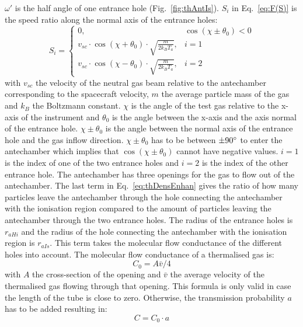 	$\omega'$ is the half angle of one entrance hole (Fig.~\ref{fig:thAntIs}). $S_i$ in Eq.~\eqref{eq:F(S)} is the speed ratio along the normal axis of the entrance holes:
	\begin{equation}
		S_i = 
		\begin{cases}
			0, & \cos(\chi \pm \theta_0) < 0\\
			v_{sc}\cdot \cos(\chi + \theta_0)\cdot \sqrt{\frac{m}{2k_B T_a}}, & i=1\\
			v_{sc}\cdot \cos(\chi - \theta_0)\cdot \sqrt{\frac{m}{2k_B T_a}}, & i=2
		\end{cases}
	\end{equation}
	with $v_{sc}$ the velocity of the neutral gas beam relative to the antechamber corresponding to the spacecraft velocity, $m$ the average particle mass of the gas and $k_B$ the Boltzmann constant. $\chi$ is the angle of the test gas relative to the x-axis of the instrument and $\theta_0$ is the angle between the x-axis and the axis normal of the entrance hole. $\chi \pm \theta_0$ is the angle between the normal axis of the entrance hole and the gas inflow direction. $\chi \pm \theta_0$ has to be between $\pm 90^\circ$ to enter the antechamber which implies that $\cos(\chi \pm \theta_0)$ cannot have negative values. $i=1$ is the index of one of the two entrance holes and $i=2$ is the index of the other entrance hole. The antechamber has three openings for the gas to flow out of the antechamber. The last term in Eq.~\eqref{eq:thDensEnhan} gives the ratio of how many particles leave the antechamber through the hole connecting the antechamber with the ionisation region compared to the amount of particles leaving the antechamber through the two entrance holes. The radius of the entrance holes is $r_{aHi}$ and the radius of the hole connecting the antechamber with the ionisation region is $r_{aIs}$. This term takes the molecular flow conductance of the different holes into account. The molecular flow conductance of a thermalised gas is:
	\begin{equation}
		C_0 = A\bar{v}/4
		\label{eq:theoMolFlowCondC0}
	\end{equation}
	with $A$ the cross-section of the opening and $\bar{v}$ the average velocity of the thermalised gas flowing through that opening. This formula is only valid in case the length of the tube is close to zero. Otherwise, the transmission probability $a$ has to be added resulting in:
	\begin{equation}
		C = C_0 \cdot a
		\label{eq:theoMolFlowCondCEff}
	\end{equation}
